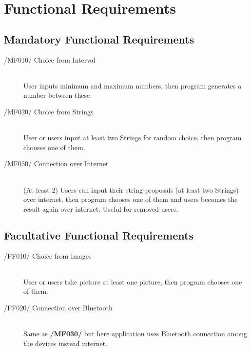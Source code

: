 \newpage
\section{Functional Requirements}

\subsection{Mandatory Functional Requirements}
\begin{description}
\item[/MF010/ Choice from Interval]\hfill \\ User inputs minimum and maximum numbers, then program generates a number between these.
\item[/MF020/ Choice from Strings]\hfill \\ User or users input at least two Strings for random choice, then program chooses one of them.
\item[/MF030/ Connection over Internet]\hfill \\ (At least 2) Users can input their string-proposals (at least two Strings) over internet, then program chooses one of them and users becomes the result again over internet. Useful for removed users.
\end{description}

\subsection{Facultative Functional Requirements}
\begin{description}
\item[/FF010/ Choice from Images]\hfill \\ User or users take picture at least one picture, then program chooses one of them.
\item[/FF020/ Connection over Bluetooth]\hfill \\ Same as \textbf{/MF030/} but here application uses Bluetooth connection among the devices instead internet.
\end{description}